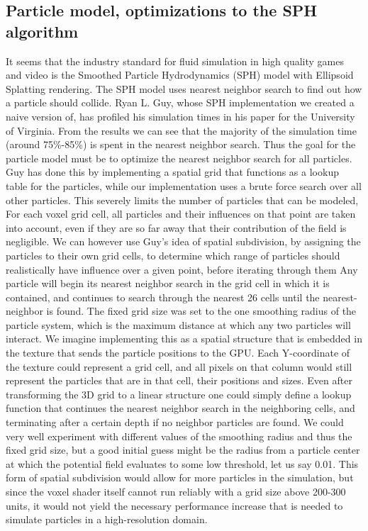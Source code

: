 \documentclass{article}
\begin{document}
\begin{multicols}{2}
        \subsection{Particle model, optimizations to the SPH algorithm}
        It seems that the industry standard for fluid simulation in high quality games and video is the Smoothed Particle Hydrodynamics (SPH) model with Ellipsoid Splatting rendering.
        The SPH model uses nearest neighbor search to find out how a particle should collide.
        Ryan L. Guy, whose SPH implementation we created a naive version of, has profiled his simulation times in his paper for the University of Virginia. From the results we can see that the majority of the simulation time (around 75\%-85\%) is spent in the nearest neighbor search.
        Thus the goal for the particle model must be to optimize the nearest neighbor search for all particles.
        \cite{guy15}
        Guy has done this by implementing a spatial grid that functions as a lookup table for the particles, while our implementation uses a brute force search over all other particles.
        This severely limits the number of particles that can be modeled, 
        For each voxel grid cell, all particles and their influences on that point are taken into account, even if they are so far away that their contribution of the field is negligible.
        We can however use Guy's idea of spatial subdivision, by assigning the particles to their own grid cells, to determine which range of particles should realistically have influence over a given point, before iterating through them 
        Any particle will begin its nearest neighbor search in the grid cell in which it is contained, and continues to search through the nearest 26 cells until the nearest-neighbor is found.
        The fixed grid size was set to the one smoothing radius of the particle system, which is the maximum distance at which any two particles will interact.
        We imagine implementing this as a spatial structure that is embedded in the texture that sends the particle positions to the GPU.
        Each Y-coordinate of the texture could represent a grid cell, and all pixels on that column would still represent the particles that are in that cell, their positions and sizes.
        Even after transforming the 3D grid to a linear structure one could simply define a lookup function that continues the nearest neighbor search in the neighboring cells, and terminating after a certain depth if no neighbor particles are found.
        We could very well experiment with different values of the smoothing radius and thus the fixed grid size, but a good initial guess might be the radius from a particle center at which the potential field evaluates to some low threshold, let us say 0.01. 
        This form of spatial subdivision would allow for more particles in the simulation, but since the voxel shader itself cannot run reliably with a grid size above 200-300 units, it would not yield the necessary performance increase that is needed to simulate particles in a high-resolution domain.


\end{multicols}
\end{document}
